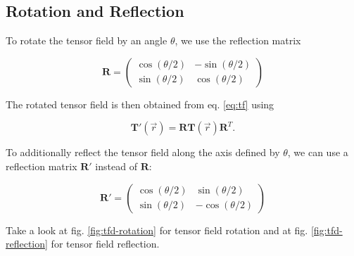 \documentclass[a4paper,10pt,notitlepage]{scrartcl}
\newcommand{\mat}[1]{\mathbf{#1}}
\begin{document}
\newpage

\subsection{Rotation and Reflection}

To rotate the tensor field by an angle $\theta$, we use the reflection matrix

\begin{equation}
 \mat{R} = \left( \begin{array}{cc}
            \cos(\theta/2) & -\sin(\theta/2) \\
            \sin(\theta/2) & \cos(\theta/2) \end{array}
\right)
\end{equation}

The rotated tensor field is then obtained from eq. \ref{eq:tf} using

\begin{equation}
 \mat{T}'(\vec{r}) = \mat{R} \mat{T}(\vec{r}) \mat{R}^T.
\end{equation}

To additionally reflect the tensor field along the axis defined by $\theta$, we
can use a reflection matrix $\mat{R}'$ instead of $\mat{R}$:

\begin{equation}
 \mat{R}' = \left( \begin{array}{cc}
            \cos(\theta/2) & \sin(\theta/2) \\
            \sin(\theta/2) & -\cos(\theta/2) \end{array}
\right)
\end{equation}

Take a look at fig. \ref{fig:tfd-rotation} for tensor field rotation and at
fig. \ref{fig:tfd-reflection} for tensor field reflection.
\end{document}
